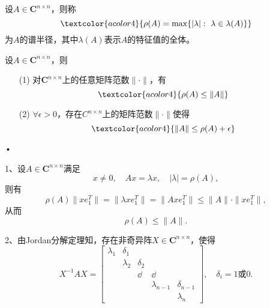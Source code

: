 \begin{frame}\ft{\subsecname}

\begin{dingyi}[谱半径]
设$A\in \mathbf{C}^{n\times n}$，则称
$$\textcolor{acolor4}{
\rho(A)=\max\{|\lambda|:~\lambda\in\lambda(A)\}
}
$$
为$A$的谱半径，其中$\lambda(A)$表示$A$的特征值的全体。
\end{dingyi}

\end{frame}

\begin{frame}\ft{\subsecname}

\begin{dingli}
设$A\in \mathbf{C}^{n\times n}$，则
\begin{itemize}
\item[(1)]
对$\mathbf{C}^{n\times n}$上的任意矩阵范数$\|\cdot\|$，有
$$ \textcolor{acolor4}{
\rho(A) \le \|A\|
}
$$
\item[(2)]
$\forall \epsilon>0$，存在$C^{n\times n}$上的矩阵范数$\|\cdot\|$使得
$$ \textcolor{acolor4}{
\|A\| \le \rho(A) + \epsilon} 
$$
\end{itemize}•
\end{dingli}

\end{frame}


\begin{frame}\ft{\subsecname}

\begin{zhengming}
1、设$A\in \mathbf{C}^{n\times n}$满足
$$
x \ne 0, \quad Ax = \lambda x, \quad |\lambda| = \rho(A),
$$ \pause
则有
$$
\rho(A) \|xe_1^T\| = \|\lambda x e_1^T\| = \|A x e_1^T\| \le \|A\| \cdot \|x e_1^T\|,
$$
从而
$$
\rho(A) \le \|A\|.
$$
\end{zhengming}
\end{frame}


\begin{frame}\ft{\subsecname}

\begin{zhengming}
2、由Jordan分解定理知，存在非奇异阵$X\in \mathbf{C}^{n\times n}$，使得
$$
X^{-1} A X = \left[
\begin{array}{ccccc}
\lambda_1 & \delta_1 & & & \\
& \lambda_2 & \delta_2 & & \\
& & \dd & \dd &\\
& & & \lambda_{n-1} & \delta_{n-1}  \\
& & &  & \lambda_{n} 
\end{array}
\right], \quad \delta_i = 1 \mbox{或} 0.
$$ 
\end{zhengming}
\end{frame}


